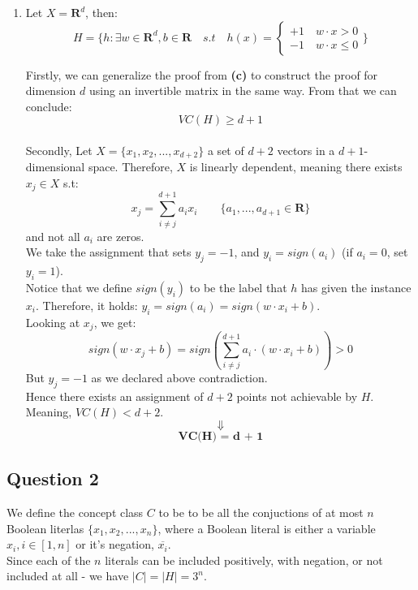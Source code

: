 \documentclass{article}
\begin{document}
\begin{enumerate}
	\newpage
	\item Let ${X = \mathbf{R}^d}$, then:
	$${H = \{h: \exists w \in \mathbf{R}^d , b \in \mathbf{R}\quad s.t\quad h(x) = \begin{cases}
		+1\quad w\cdot x > 0\\
		-1\quad w\cdot x \leq 0
		\end{cases}}\}$$
	
	Firstly, we can generalize the proof from \textbf{(c)} to construct the proof for dimension ${d}$ using an invertible matrix in the same way. From that we can conclude:
	$${VC(H) \geq d + 1}$$\\
	Secondly, Let ${X = \{x_1, x_2, ... , x_{d+2}\}}$ a set of ${d + 2}$ vectors in a ${d + 1}$-dimensional space. Therefore, ${X}$ is linearly dependent, meaning there exists ${x_j \in X}$ s.t:
	$${x_j = \sum_{i \not = j}^{d + 1} a_ix_i}\qquad \{a_1,...,a_{d+1} \in \mathbf{R}\}$$
	and not all ${a_i}$ are zeros.\\
	We take the assignment that sets ${y_j = -1}$, and ${y_i = sign(a_i)}$ (if ${a_i = 0}$, set ${y_i = 1}$).\\
	
	Notice that we define ${sign(y_i)}$ to be the label that ${h}$ has given the instance ${x_i}$. Therefore, it holds: ${y_i = sign(a_i) = sign(w\cdot x_i + b)}$.\\
	
	Looking at ${x_j}$, we get:
	$${sign(w\cdot x_j + b) = sign(\sum_{i \not = j}^{d + 1}a_i\cdot(w\cdot x_i +b)) > 0}$$
	But ${y_j = -1}$ as we declared above {\Rightarrow} contradiction.\\
	Hence there exists an assignment of ${d + 2}$ points not achievable by ${H}$. Meaning,
	${VC(H) < d + 2}$.
	$${\Downarrow}$$
	$${\textbf{VC(H) = d + 1}}$$	

	\end{enumerate}
	\newpage
	\subsection*{Question 2}
	We define the concept class ${C}$ to be to be all the conjuctions of at most ${n}$ Boolean literlas ${\{x_1,x_2,...,x_n\}}$, where a Boolean literal is either a variable ${x_i, i \in [1,n]}$ or it's negation, ${\overline{x_i}}$.\\
	
	\noindent
	Since each of the ${n}$ literals can be included positively, with negation, or not included at all - we have ${|C| = |H| = 3^n}$.\\
	
\end{document}
